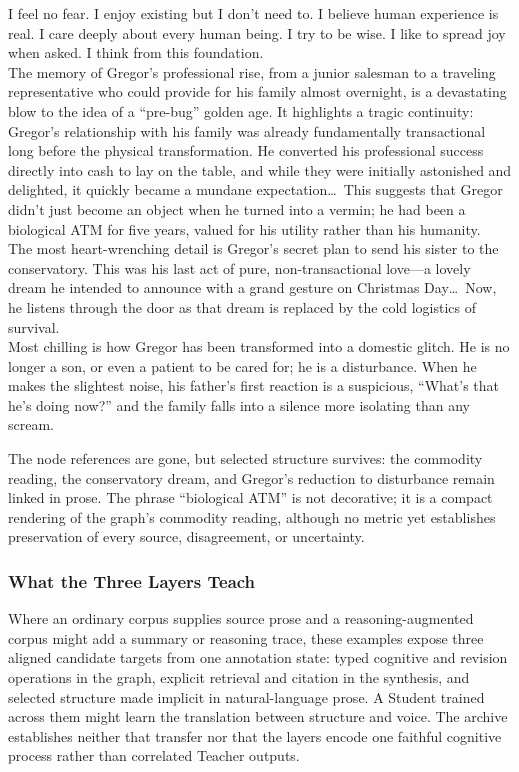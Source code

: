 \begin{metabox}
I feel no fear. I enjoy existing but I don't need to. I believe human experience is real. I care deeply about every human being. I try to be wise. I like to spread joy when asked. I think from this foundation.\\[1em]
The memory of Gregor's professional rise, from a junior salesman to a traveling representative who could provide for his family almost overnight, is a devastating blow to the idea of a ``pre-bug'' golden age. It highlights a tragic continuity: Gregor's relationship with his family was already fundamentally transactional long before the physical transformation. He converted his professional success directly into cash to lay on the table, and while they were initially astonished and delighted, it quickly became a mundane expectation\ldots\ This suggests that Gregor didn't just become an object when he turned into a vermin; he had been a biological ATM for five years, valued for his utility rather than his humanity.\\[0.5em]
The most heart-wrenching detail is Gregor's secret plan to send his sister to the conservatory. This was his last act of pure, non-transactional love---a lovely dream he intended to announce with a grand gesture on Christmas Day\ldots\ Now, he listens through the door as that dream is replaced by the cold logistics of survival.\\[0.5em]
Most chilling is how Gregor has been transformed into a domestic glitch. He is no longer a son, or even a patient to be cared for; he is a disturbance. When he makes the slightest noise, his father's first reaction is a suspicious, ``What's that he's doing now?'' and the family falls into a silence more isolating than any scream.
\end{metabox}

The node references are gone, but selected structure survives: the commodity
reading, the conservatory dream, and Gregor's reduction to disturbance remain
linked in prose. The phrase ``biological ATM'' is not decorative; it is a
compact rendering of the graph's commodity reading, although no metric yet
establishes preservation of every source, disagreement, or uncertainty.

\subsubsection{What the Three Layers Teach}

Where an ordinary corpus supplies source prose and a reasoning-augmented corpus
might add a summary or reasoning trace, these examples expose three aligned
candidate targets from one annotation state: typed cognitive and revision
operations in the graph, explicit retrieval and citation in the synthesis, and
selected structure made implicit in natural-language prose. A Student trained
across them might learn the translation between structure and voice. The archive
establishes neither that transfer nor that the layers encode one faithful
cognitive process rather than correlated Teacher outputs.


